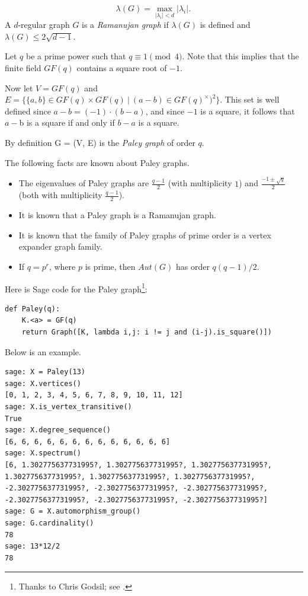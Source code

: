 \[
    \lambda(G) = \max_{|\lambda_i| < d} |\lambda_i|.\,
\]
A $d$-regular graph $G$ is a {\it Ramanujan graph} if $\lambda(G)$ is defined and
$\lambda(G) \leq 2\sqrt{d-1}$.


Let $q$ be a prime power such that $q\equiv 1 \pmod{4}$. Note that this implies that
the finite field $GF(q)$ contains a square root of $-1$.

Now let $V=GF(q)$ and $E=\{\{a,b\}\in GF(q)\times GF(q)\ |\ (a-b)\in GF(q)^{\times})^2 \}$.
This set is well defined since $a - b = (-1)\cdot (b - a)$, and since
$-1$ is a square, it follows that $a - $b is a square if and only if $b - a$ is a square.

By definition G = (V, E) is the {\it Paley graph} of order $q$.

The following facts are known about Paley graphs.
\begin{itemize}
\item
The eigenvalues of Paley graphs are $\frac{q-1}{2}$ (with multiplicity $1$) and
$\frac{-1 \pm \sqrt{q}}{2}$ (both with multiplicity $\frac{q-1}{2}$).

\item
It is known that a Paley graph is a Ramanujan graph.

\item
It is known that the family of Paley graphs of prime order is
a vertex expander graph family.

\item
If $q=p^r$, where $p$ is prime, then $Aut(G)$ has order $q(q-1)/2$.

\end{itemize}

Here is Sage code for the Paley graph\footnote{Thanks to Chris Godsil;
see \cite{GodsilBeezer2012}.}:

\begin{lstlisting}
def Paley(q):
    K.<a> = GF(q)
    return Graph([K, lambda i,j: i != j and (i-j).is_square()])
\end{lstlisting}

Below is an example.

\begin{lstlisting}
sage: X = Paley(13)
sage: X.vertices()
[0, 1, 2, 3, 4, 5, 6, 7, 8, 9, 10, 11, 12]
sage: X.is_vertex_transitive()
True
sage: X.degree_sequence()
[6, 6, 6, 6, 6, 6, 6, 6, 6, 6, 6, 6, 6]
sage: X.spectrum()
[6, 1.302775637731995?, 1.302775637731995?, 1.302775637731995?,
1.302775637731995?, 1.302775637731995?, 1.302775637731995?,
-2.302775637731995?, -2.302775637731995?, -2.302775637731995?,
-2.302775637731995?, -2.302775637731995?, -2.302775637731995?]
sage: G = X.automorphism_group()
sage: G.cardinality()
78
sage: 13*12/2
78
\end{lstlisting}


